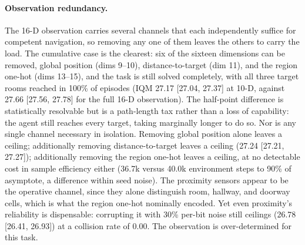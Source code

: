 \documentclass[10pt]{article}
\begin{document}
\paragraph{Observation redundancy.} The 16-D observation carries several channels that each
independently suffice for competent navigation, so removing any one of them leaves the others
to carry the load. The cumulative case is the clearest: six of the sixteen dimensions can be
removed, global position (dims 9--10), distance-to-target (dim 11), and the region one-hot
(dims 13--15), and the task is still solved completely, with all three target rooms reached
in 100\% of episodes (IQM 27.17 [27.04, 27.37] at 10-D, against 27.66 [27.56, 27.78] for the
full 16-D observation). The half-point difference is statistically resolvable but is a
path-length tax rather than a loss of capability: the agent still reaches every target,
taking marginally longer to do so. Nor is any single channel necessary in isolation. Removing
global position alone leaves a ceiling; additionally removing distance-to-target leaves a
ceiling (27.24 [27.21, 27.27]); additionally removing the region one-hot leaves a ceiling, at
no detectable cost in sample efficiency either (36.7k versus 40.0k environment steps to 90\%
of asymptote, a difference within seed noise). The proximity sensors appear to be the
operative channel, since they alone distinguish room, hallway, and doorway cells, which is
what the region one-hot nominally encoded. Yet even proximity's reliability is dispensable:
corrupting it with 30\% per-bit noise still ceilings (26.78 [26.41, 26.93]) at a collision
rate of 0.00. The observation is over-determined for this task.
\end{document}
